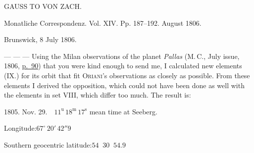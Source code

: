 \begin{center}
GAUSS TO VON ZACH.
\end{center}

\begin{center}
Monatliche Correspondenz. Vol. XIV. Pp. 187–192. August 1806.
\end{center}

\begin{flushright}
Brunswick, 8 July 1806.
\end{flushright}

\par\indent --- --- --- Using the Milan observations of the planet \emph{Pallas} (M.\,C., July issue, 1806, \href{https://www.digitale-sammlungen.de/en/view/bsb10538606?page=100}{p.~90}) that you were kind enough to send me, I calculated new elements (IX.) for its orbit that fit \textsc{Oriani}’s observations as closely as possible. From these elements I derived the opposition, which could not have been done as well with the elements in set VIII, which differ too much. The result is:

\begin{center}
1805. Nov. 29.\ \ $11^{\mathrm{u}}\,18^{\mathrm{m}}\,17^{\mathrm{s}}$ mean time at Seeberg.

Longitude:\quad $67^\circ\,20'\,42''9$

Southern geocentric latitude:\quad $54\;\;30\;\;54.9$
\end{center}

